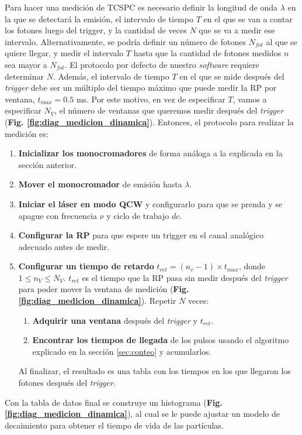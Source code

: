 Para hacer una medición de TCSPC es necesario definir la longitud de onda $\lambda$ en la que se detectará la emisión, el intervalo de tiempo $T$ en el que se van a contar los fotones luego del trigger, y la cantidad de veces $N$ que se va a medir ese intervalo.
Alternativamente, se podría definir un número de fotones $N_{fot}$ al que se quiere llegar, y medir el intervalo $T$ hasta que la cantidad de fotones medidos $n$ sea mayor a $N_{fot}$.
El protocolo por defecto de nuestro \textit{software} requiere determinar $N$.
Además, el intervalo de tiempo $T$ en el que se mide después del \textit{trigger} debe ser un múltiplo del tiempo máximo que puede medir la RP por ventana, $t_{max} = 0.5$ ms.
Por este motivo, en vez de especificar $T$, vamos a especificar $N_V$, el número de ventanas que queremos medir después del \textit{trigger} (\textbf{Fig. \ref{fig:diag_medicion_dinamica}}).
Entonces, el protocolo para realizar la medición es:

\begin{enumerate}
     \item \textbf{Inicializar los monocromadores} de forma análoga a la explicada en la sección anterior.
     \item \textbf{Mover el monocromador} de emisión hasta $\lambda$.
     \item \textbf{Iniciar el láser en modo QCW} y configurarlo para que se prenda y se apague con frecuencia $\nu$ y ciclo de trabajo $dc$.
     \item \textbf{Configurar la RP} para que espere un trigger en el canal analógico adecuado antes de medir.
     \item \textbf{Configurar un tiempo de retardo} $t_{ret} = (n_v - 1) \times t_{max}$, donde $1 \leq n_V \leq N_V$. $t_{ret}$ es el tiempo que la RP pasa sin medir después del \textit{trigger} para poder mover la ventana de medición (\textbf{Fig. \ref{fig:diag_medicion_dinamica}}). Repetir $N$ veces:
     \begin{enumerate}
          \item \textbf{Adquirir una ventana} después del \textit{trigger} y $t_{ret}$.
          \item \textbf{Encontrar los tiempos de llegada} de los pulsos usando el algoritmo explicado en la sección \ref{sec:conteo} y acumularlos.
     \end{enumerate}
     Al finalizar, el resultado es una tabla con los tiempos en los que llegaron los fotones después del \textit{trigger}.
\end{enumerate}

Con la tabla de datos final se construye un histograma (\textbf{Fig. \ref{fig:diag_medicion_dinamica}}), al cual se le puede ajustar un modelo de decaimiento para obtener el tiempo de vida de las partículas.
